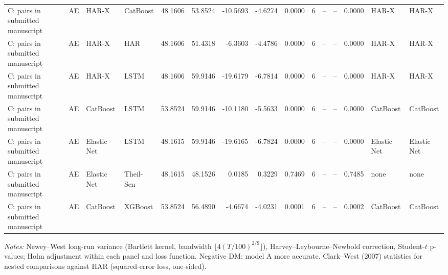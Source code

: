 \begin{table}[htbp]
{\begin{tabular}{llllrrrrrrrrrll}
C: pairs in submitted manuscript & AE & HAR-X & CatBoost & 48.1606 & 53.8524 & -10.5693 & -4.6274 & 0.0000 & 6 & -- & -- & 0.0000 & HAR-X & HAR-X \\
C: pairs in submitted manuscript & AE & HAR-X & HAR & 48.1606 & 51.4318 & -6.3603 & -4.4786 & 0.0000 & 6 & -- & -- & 0.0000 & HAR-X & HAR-X \\
C: pairs in submitted manuscript & AE & HAR-X & LSTM & 48.1606 & 59.9146 & -19.6179 & -6.7814 & 0.0000 & 6 & -- & -- & 0.0000 & HAR-X & HAR-X \\
C: pairs in submitted manuscript & AE & CatBoost & LSTM & 53.8524 & 59.9146 & -10.1180 & -5.5633 & 0.0000 & 6 & -- & -- & 0.0000 & CatBoost & CatBoost \\
C: pairs in submitted manuscript & AE & Elastic Net & LSTM & 48.1615 & 59.9146 & -19.6165 & -6.7824 & 0.0000 & 6 & -- & -- & 0.0000 & Elastic Net & Elastic Net \\
C: pairs in submitted manuscript & AE & Elastic Net & Theil-Sen & 48.1615 & 48.1526 & 0.0185 & 0.3229 & 0.7469 & 6 & -- & -- & 0.7485 & none & none \\
C: pairs in submitted manuscript & AE & CatBoost & XGBoost & 53.8524 & 56.4890 & -4.6674 & -4.0231 & 0.0001 & 6 & -- & -- & 0.0002 & CatBoost & CatBoost \\
\bottomrule
\end{tabular}%
}
\par\vspace{2pt}\footnotesize\textit{Notes:} Newey--West long-run variance (Bartlett kernel, bandwidth $\lfloor 4(T/100)^{2/9} \rfloor$), Harvey--Leybourne--Newbold correction, Student-$t$ p-values; Holm adjustment within each panel and loss function. Negative DM: model A more accurate. Clark--West (2007) statistics for nested comparisons against HAR (squared-error loss, one-sided).
\end{table}
